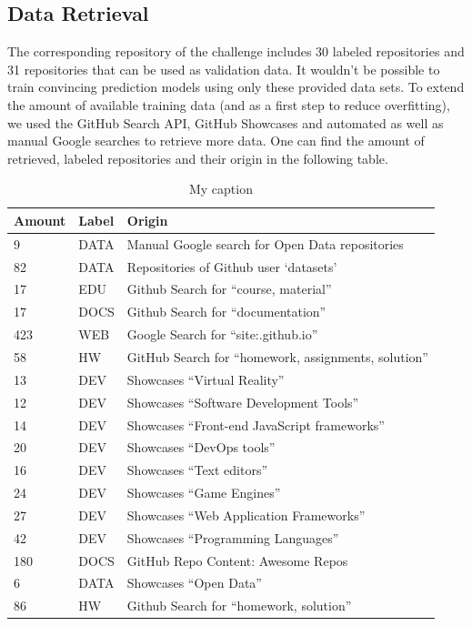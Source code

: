 \documentclass[a4paper,12pt]{article}
\begin{document}
\subsection{Data Retrieval}\label{data-retrieval}

The corresponding repository of the challenge includes 30 labeled
repositories and 31 repositories that can be used as validation data. It
wouldn't be possible to train convincing prediction models using only
these provided data sets. To extend the amount of available training
data (and as a first step to reduce overfitting), we used the GitHub
Search API, GitHub Showcases and automated as well as manual Google
searches to retrieve more data. One can find the amount of retrieved,
labeled repositories and their origin in the following table.

\begin{table}[]
\centering
\label{data_sources}
\caption{My caption}
\begin{tabular}{|l|l|l|}
\hline
Amount & Label & Origin \\ \hline
9 & DATA & Manual Google search for Open Data
repositories \\ \hline
82 & DATA & Repositories of Github user `datasets' \\ \hline
17 & EDU & Github Search for ``course, material'' \\ \hline
17 & DOCS & Github Search for ``documentation'' \\ \hline
423 & WEB & Google Search for ``site:.github.io'' \\ \hline
58 & HW & GitHub Search for ``homework, assignments,
solution'' \\ \hline
13 & DEV & Showcases ``Virtual Reality'' \\ \hline
12 & DEV & Showcases ``Software Development Tools'' \\ \hline
14 & DEV & Showcases ``Front-end JavaScript frameworks'' \\ \hline
20 & DEV & Showcases ``DevOps tools'' \\ \hline
16 & DEV & Showcases ``Text editors'' \\ \hline
24 & DEV & Showcases ``Game Engines'' \\ \hline
27 & DEV & Showcases ``Web Application Frameworks'' \\ \hline
42 & DEV & Showcases ``Programming Languages'' \\ \hline
180 & DOCS & GitHub Repo Content: Awesome Repos \\ \hline
6 & DATA & Showcases ``Open Data'' \\ \hline
86 & HW & Github Search for ``homework, solution'' \\ \hline
\end{tabular}
\end{table}
\end{document}
